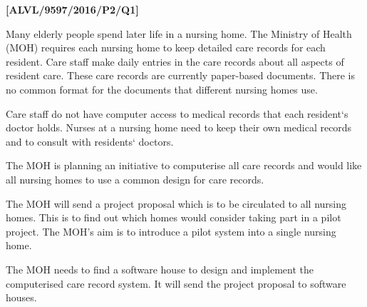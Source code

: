 \item \textbf{{[}ALVL/9597/2016/P2/Q1{]} }

Many elderly people spend later life in a nursing home. The Ministry
of Health (MOH) requires each nursing home to keep detailed care records
for each resident. Care staff make daily entries in the care records
about all aspects of resident care. These care records are currently
paper-based documents. There is no common format for the documents
that different nursing homes use. 

Care staff do not have computer access to medical records that each
resident\textquoteleft s doctor holds. Nurses at a nursing home need
to keep their own medical records and to consult with residents\textquoteleft{}
doctors.

The MOH is planning an initiative to computerise all care records
and would like all nursing homes to use a common design for care records.

The MOH will send a project proposal which is to be circulated to
all nursing homes. This is to find out which homes would consider
taking part in a pilot project. The MOH's aim is to introduce a pilot
system into a single nursing home.

The MOH needs to find a software house to design and implement the
computerised care record system. It will send the project proposal
to software houses.

